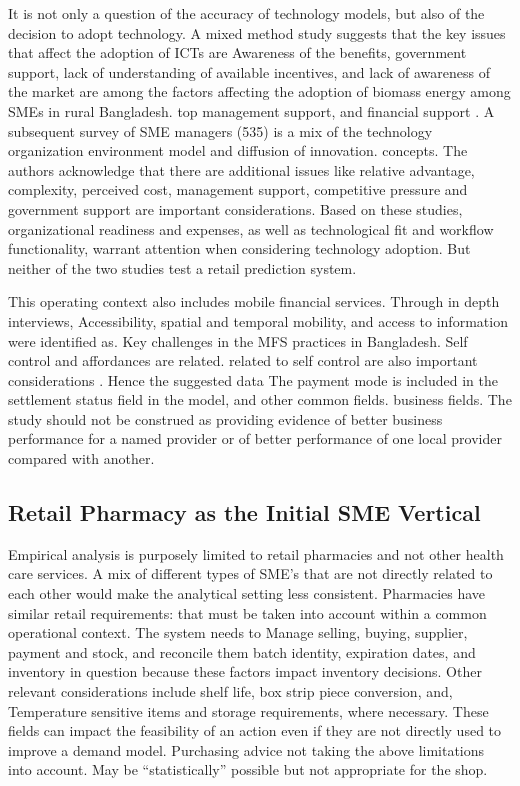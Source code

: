\documentclass[a4paper,11pt,oneside]{book}
\theoremstyle{plain}
\theoremstyle{definition}
\theoremstyle{remark}
\begin{document}
It is not only a question of the accuracy of technology models, but also of the decision to adopt technology. A mixed method study suggests that the key issues that affect the adoption of ICTs are Awareness of the benefits, government support, lack of understanding of available incentives, and lack of awareness of the market are among the factors affecting the adoption of biomass energy among SMEs in rural Bangladesh. top management support, and financial support \cite{hoque2016ict}. A subsequent survey of SME managers (535) is a mix of the technology organization environment model and diffusion of innovation. concepts. The authors \cite{shahadat2023digital} acknowledge that there are additional issues like relative advantage, complexity, perceived cost, management support, competitive pressure and government support are important considerations. Based on these studies, organizational readiness and expenses, as well as technological fit and workflow functionality, warrant attention when considering technology adoption. But neither of the two studies test a retail prediction system.

This operating context also includes mobile financial services. Through in depth interviews, Accessibility, spatial and temporal mobility, and access to information were identified as. Key challenges in the MFS practices in Bangladesh. Self control and affordances are related. related to self control are also important considerations \cite{hazra2021mfs}. Hence the suggested data The payment mode is included in the settlement status field in the model, and other common fields. business fields. The study should not be construed as providing evidence of better business performance for a named provider or of better performance of one local provider compared with another.

\subsection{Retail Pharmacy as the Initial SME Vertical}

Empirical analysis is purposely limited to retail pharmacies and not other health care services. A mix of different types of SME's that are not directly related to each other would make the analytical setting less consistent. Pharmacies have similar retail requirements: that must be taken into account within a common operational context. The system needs to Manage selling, buying, supplier, payment and stock, and reconcile them batch identity, expiration dates, and inventory in question because these factors impact inventory decisions. Other relevant considerations include shelf life, box strip piece conversion, and, Temperature sensitive items and storage requirements, where necessary. These fields can impact the feasibility of an action even if they are not directly used to improve a demand model. Purchasing advice not taking the above limitations into account. May be “statistically” possible but not appropriate for the shop.
\end{document}
